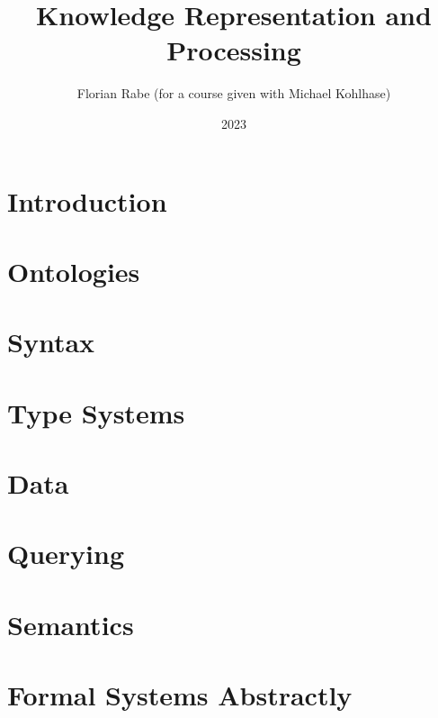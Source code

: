 \documentclass{beamer}
\begin{document}
\title{Knowledge Representation and Processing}
\author{Florian Rabe (for a course given with Michael Kohlhase)}
\date{2023}
\begin{frame}
    \titlepage
\end{frame}

\part{Introduction}


\part{Ontologies}


\part{Syntax}


\part{Type Systems}


\part{Data}


\part{Querying}


\part{Semantics}


\part{Formal Systems Abstractly}

\end{document}
